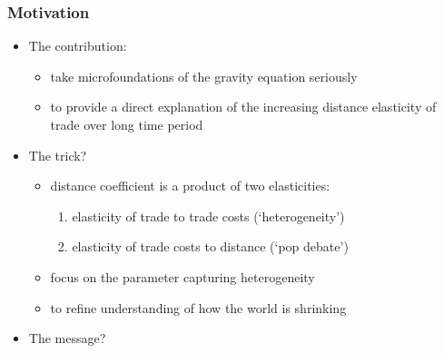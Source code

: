 \documentclass{beamer}
\begin{document}
\begin{frame}[plain]\frametitle{Motivation}
\vspace{0.3cm}
\begin{itemize}
\item The contribution:
\vspace{0.2cm}
\begin{itemize}
\item take microfoundations of the gravity equation seriously
\item to provide a direct explanation of the increasing distance elasticity of trade over long time period
\end{itemize}
\vspace{0.3cm}
\item The trick? 
\vspace{0.2cm}
\begin{itemize}
\item distance coefficient is a product of two elasticities:
\begin{enumerate}
\item elasticity of trade to trade costs (`heterogeneity')
\item elasticity of trade costs to distance (`pop debate')
\end{enumerate}
\item focus on the parameter capturing heterogeneity
\item to refine understanding of how the world is shrinking 
\vspace{0.3cm}
\end{itemize}
\vspace{0.3cm}
\item The message?

\end{itemize}
\end{frame}
\end{document}

